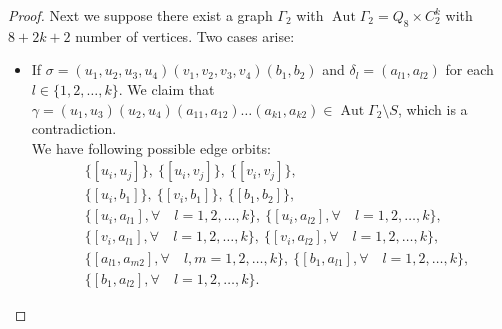 \documentclass[10pt,a4paper]{amsart}
\newcommand{\Aut}{\mathop{\mathrm{Aut}}}
\begin{document}
\begin{proof}
		
		Next we suppose there exist a graph $\Gamma_{2}$ with $\Aut \Gamma_{2} = Q_{8} \times C_{2}^{k}$ with $8+2k+2$ number of vertices. Two cases arise:
		\begin{itemize}
			\item [(a)] If $\sigma = (u_{1}, u_{2}, u_{3}, u_{4})(v_{1}, v_{2}, v_{3}, v_{4})(b_{1}, b_{2})$ and $\delta_{l} = (a_{l1}, a_{l2})$ for each $l \in \{1,2,\ldots,k\}$.
			We claim  that  $\gamma = (u_{1}, u_{3}) (u_{2}, u_{4})(a_{11}, a_{12})\ldots(a_{k1}, a_{k2}) \in \Aut \Gamma_{2} \setminus S$, which is a contradiction.\\
			We have following possible edge orbits:
			\begin{align*}
				& \{[u_{i}, u_{j}]\},\
				\{[u_{i}, v_{j}]\},\
				\{[v_{i}, v_{j}]\},\\
				&\{[u_{i}, b_{1}]\},\
				\{[v_{i}, b_{1}]\},\
				\{[b_{1}, b_{2}]\},\\
				&\{[u_{i}, a_{l1}], \forall \quad l =1,2,\ldots,k\},\
				\{[u_{i}, a_{l2}], \forall \quad l =1,2,\ldots,k\},\\	
				&\{[v_{i}, a_{l1}], \forall \quad l =1,2,\ldots,k\},\
				\{[v_{i}, a_{l2}], \forall \quad l =1,2,\ldots,k\},\\
				&\{[a_{l1}, a_{m2}], \forall \quad l,m =1,2,\ldots,k\},\
				\{[b_{1}, a_{l1}], \forall \quad l =1,2,\ldots,k\},\\
				&\{[b_{1}, a_{l2}], \forall \quad l =1,2,\ldots,k\}.		
			\end{align*}
			

\end{itemize}
\end{proof}
\end{document}

